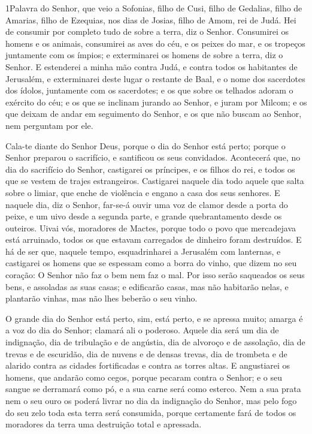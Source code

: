 
\lettrine{1} Palavra do Senhor, que veio a Sofonias, filho de
Cusi, filho de Gedalias, filho de Amarias, filho de Ezequias, nos
dias de Josias, filho de Amom, rei de Judá. Hei de consumir por
completo tudo de sobre a terra, diz o Senhor. Consumirei os
homens e os animais, consumirei as aves do céu, e os peixes do mar,
e os tropeços juntamente com os ímpios; e exterminarei os homens de
sobre a terra, diz o Senhor. E estenderei a minha mão contra
Judá, e contra todos os habitantes de Jerusalém, e exterminarei
deste lugar o restante de Baal, e o nome dos sacerdotes dos ídolos,
juntamente com os sacerdotes; e os que sobre os telhados adoram
o exército do céu; e os que se inclinam jurando ao Senhor, e juram
por Milcom; e os que deixam de andar em seguimento do Senhor, e
os que não buscam ao Senhor, nem perguntam por ele.

Cala-te diante do Senhor Deus, porque o dia do Senhor está perto;
porque o Senhor preparou o sacrifício, e santificou os seus
convidados. Acontecerá que, no dia do sacrifício do Senhor,
castigarei os príncipes, e os filhos do rei, e todos os que se
vestem de trajes estrangeiros. Castigarei naquele dia todo
aquele que salta sobre o limiar, que enche de violência e engano a
casa dos seus senhores. E naquele dia, diz o Senhor, far-se-á
ouvir uma voz de clamor desde a porta do peixe, e um uivo desde a
segunda parte, e grande quebrantamento desde os outeiros.
Uivai vós, moradores de Mactes, porque todo o povo que
mercadejava está arruinado, todos os que estavam carregados de
dinheiro foram destruídos. E há de ser que, naquele tempo,
esquadrinharei a Jerusalém com lanternas, e castigarei os homens que
se espessam como a borra do vinho, que dizem no seu coração: O
Senhor não faz o bem nem faz o mal. Por isso serão saqueados
os seus bens, e assoladas as suas casas; e edificarão casas, mas não
habitarão nelas, e plantarão vinhas, mas não lhes beberão o seu
vinho.

O grande dia do Senhor está perto, sim, está perto, e se apressa
muito; amarga é a voz do dia do Senhor; clamará ali o poderoso.
Aquele dia será um dia de indignação, dia de tribulação e de
angústia, dia de alvoroço e de assolação, dia de trevas e de
escuridão, dia de nuvens e de densas trevas, dia de trombeta
e de alarido contra as cidades fortificadas e contra as torres
altas. E angustiarei os homens, que andarão como cegos,
porque pecaram contra o Senhor; e o seu sangue se derramará como pó,
e a sua carne será como esterco. Nem a sua prata nem o seu
ouro os poderá livrar no dia da indignação do Senhor, mas pelo fogo
do seu zelo toda esta terra será consumida, porque certamente fará
de todos os moradores da terra uma destruição total e apressada.

